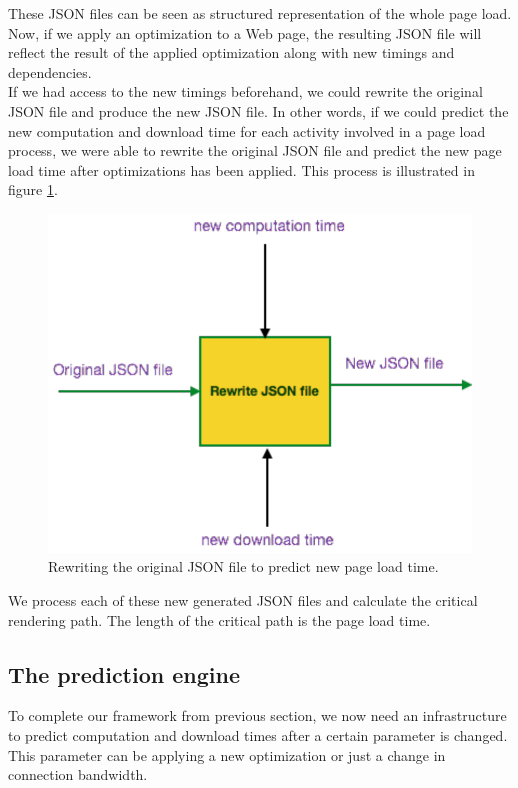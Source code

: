  
 
\noindent These JSON files can be seen as structured representation of the whole page load. Now, if we apply an optimization to a Web page, the resulting JSON file will reflect the result of the applied optimization along with new timings and dependencies.\\

\noindent If we had access to the new timings beforehand, we could rewrite the original JSON file and produce the new JSON file. In other words, if we could predict the new computation and download time for each activity involved in a page load process, we were able to rewrite the original JSON file and predict the new page load time after optimizations has been applied.
This process is illustrated in figure \ref{fig:platform}.
\begin{figure}[!htb]
  \centering
    \includegraphics[width=0.85 \textwidth]{./figures/optimization/platform.pdf}
  \caption {Rewriting the original JSON file to predict new page load time.}
  \label{fig:platform}
\end{figure}

\noindent We process each of these new generated JSON files and calculate the critical rendering path. The length of the critical path is the page load time.\\

\subsection {The prediction engine}
To complete our framework from previous section, we now need an infrastructure to predict computation and download times after a certain parameter is changed. This parameter can be applying a new optimization or just a change in connection bandwidth.
 
